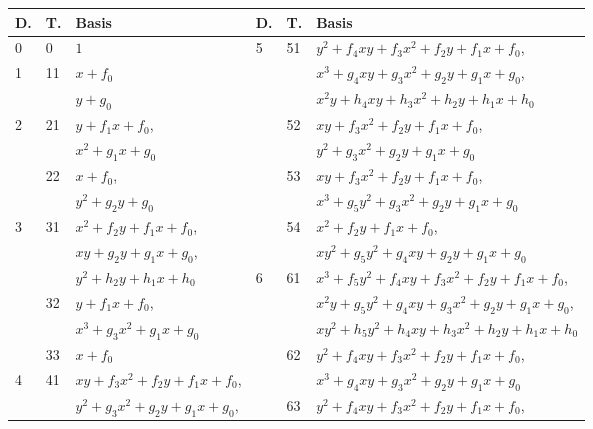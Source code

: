 \begin{center}
\begin{tabular}{l|l|l||l|l|l}
  D. & T. & Basis & D. & T. & Basis \\
  \hline
  0 & 0 & $1$ & \multirow{9}{*}{5} &\multirow{3}{*}{51} & $y^2 + f_4xy + f_3x^2 + f_2y + f_1x + f_0$, \\
  \cline{1-3}
  \multirow{2}{*}{1} &\multirow{2}{*}{11} & $x + f_0$ & & & $x^3 + g_4xy + g_3x^2 + g_2y + g_1x + g_0$, \\
    & & $y + g_0$ & & & $x^2y + h_4xy + h_3x^2 + h_2y + h_1x + h_0$ \\
  \cline{1-3}\cline{5-6}
  \multirow{4}{*}{2} &\multirow{2}{*}{21} & $y + f_1x + f_0$, & & \multirow{2}{*}{52} & $xy + f_3x^2 + f_2y + f_1x + f_0$, \\
    & & $x^2 + g_1x + g_0$ & & & $y^2 + g_3x^2 + g_2y + g_1x + g_0$ \\
    \cline{2-3}\cline{5-6}
    &\multirow{2}{*}{22}  & $x + f_0$, & & \multirow{2}{*}{53} & $xy + f_3x^2 + f_2y + f_1x + f_0$, \\
    & & $y^2 + g_2y + g_0$ & & & $x^3 + g_5y^2 + g_3x^2 + g_2y + g_1x + g_0$ \\
  \cline{1-3}\cline{5-6}
  \multirow{6}{*}{3} &\multirow{3}{*}{31} & $x^2 + f_2y + f_1x + f_0$, & & \multirow{2}{*}{54} & $x^2 + f_2y + f_1x + f_0$, \\
    & & $xy + g_2y + g_1x + g_0$, & & & $xy^2 + g_5y^2 + g_4xy + g_2y + g_1x + g_0$ \\
  \cline{4-6}
    & & $y^2 + h_2y + h_1x + h_0$ & \multirow{10}{*}{6} &\multirow{3}{*}{61} & $x^3 + f_5y^2 + f_4xy + f_3x^2 + f_2y + f_1x + f_0$, \\
    \cline{2-3}
    &\multirow{2}{*}{32} & $y + f_1x + f_0$, & & & $x^2y + g_5y^2 + g_4xy + g_3x^2 + g_2y + g_1x + g_0$, \\
    & & $x^3 + g_3x^2 + g_1x + g_0$ & & & $xy^2 + h_5y^2 + h_4xy + h_3x^2 + h_2y + h_1x + h_0$ \\
    \cline{2-3}\cline{5-6}
    &\multirow{1}{*}{33} & $x + f_0$ & &\multirow{2}{*}{62} & $y^2 + f_4xy + f_3x^2 + f_2y + f_1x + f_0$, \\
  \cline{1-3}
  \multirow{8}{*}{4} &\multirow{3}{*}{41} & $xy + f_3x^2 + f_2y + f_1x + f_0$, & & & $x^3 + g_4xy + g_3x^2 + g_2y + g_1x + g_0$ \\
  \cline{5-6}
    & & $y^2 + g_3x^2 + g_2y + g_1x + g_0$, & &\multirow{2}{*}{63} & $y^2 + f_4xy + f_3x^2 + f_2y + f_1x + f_0$, \\

\end{tabular}
\end{center}
